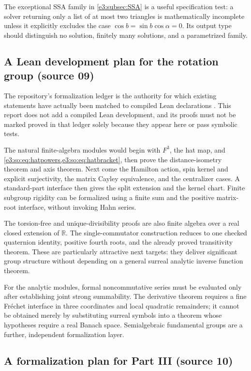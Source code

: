 \documentclass[11pt,letterpaper]{article}
\numberwithin{equation}{section}
\theoremstyle{definition}
\theoremstyle{remark}
\newcommand{\R}{\mathbb R}
\begin{document}
The exceptional SSA family in \cref{e3:subsec:SSA} is a useful specification
test: a solver returning only a list of at most two triangles is
mathematically incomplete unless it explicitly excludes the case
$\cos b=\sin b\cos\alpha=0$. Its output type should distinguish no
solution, finitely many solutions, and a parametrized family.

\subsection{A Lean development plan for the rotation group (source 09)}\label{e3:sub:lean09}

The repository's formalization ledger is the authority for which existing
statements have actually been matched to compiled Lean declarations
\cite{RepoLedger}. This report does not add a compiled Lean development, and
its proofs must not be marked proved in that ledger solely because they appear
here or pass symbolic tests.

The natural finite-algebra modules would begin with \(F^3\), the hat map, and
\cref{e3:so:eq:hatpowers,e3:so:eq:hatbracket}, then prove the distance-isometry theorem and
axis theorem. Next come the Hamilton action, spin kernel and explicit
surjectivity, the matrix Cayley equivalence, and the centralizer cases. A
standard-part interface then gives the split extension and the kernel chart.
Finite subgroup rigidity can be formalized using a finite sum and the positive
matrix-root interface, without invoking Hahn series.

The torsion-free and unique-divisibility proofs are also finite algebra over a
real closed extension of \(\R\). The single-commutator construction reduces
to one checked quaternion identity, positive fourth roots, and the already
proved transitivity theorem. These are particularly attractive next targets:
they deliver significant group structure without depending on a general
surreal analytic inverse function theorem.

For the analytic modules, formal noncommutative series must be evaluated only
after establishing joint strong summability. The derivative theorem requires a
fine Fr\'echet interface in three coordinates and local quadratic remainders;
it cannot be obtained merely by substituting surreal symbols into a theorem
whose hypotheses require a real Banach space. Semialgebraic fundamental groups
are a further, independent formalization layer.

\subsection{A formalization plan for Part III (source 10)}\label{e3:cut:sub:lean}
\end{document}
